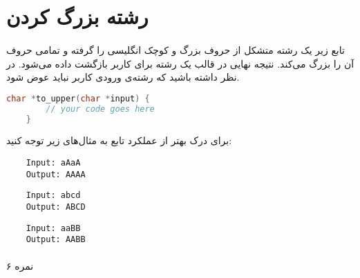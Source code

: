 \documentclass[../main.tex]{subfiles}
\begin{document}
\section{رشته بزرگ کردن}
\paragraph{}
تابع زیر یک رشته متشکل از حروف بزرگ و کوچک انگلیسی را گرفته
و تمامی حروف آن را بزرگ می‌کند. نتیجه نهایی در قالب یک رشته برای کاربر بازگشت داده می‌شود.
در نظر داشته باشید که رشته‌ی ورودی کاربر نباید عوض شود.

\begin{latin}
\begin{lstlisting}[language=c]
    char *to_upper(char *input) {
        // your code goes here
    }
\end{lstlisting}
\end{latin}

برای درک بهتر از عملکرد تابع به مثال‌های زیر توجه کنید:

\begin{latin}
\begin{verbatim}
    Input: aAaA
    Output: AAAA
\end{verbatim}

\begin{verbatim}
    Input: abcd
    Output: ABCD
\end{verbatim}

\begin{verbatim}
    Input: aaBB
    Output: AABB
\end{verbatim}
\end{latin}

\paragraph{}
۶ نمره
\end{document}

